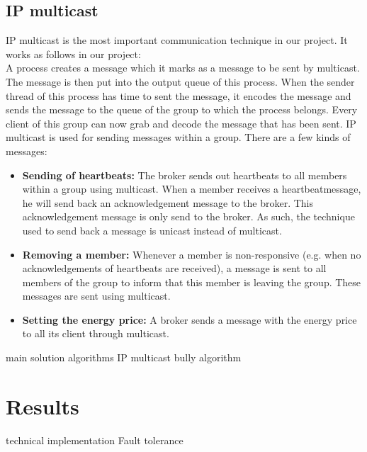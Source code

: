 \documentclass[10pt]{article} %
\begin{document}
\subsection{IP multicast}
IP multicast is the most important communication technique in our project. It works as follows in our project:\\
A process creates a message which it marks as a message to be sent by multicast. The message is then put into the output queue of this process. When the sender thread of this process has time to sent the message, it encodes the message and sends the message to the queue of the group to which the process belongs. Every client of this group can now grab and decode the message that has been sent.
IP multicast is used for sending messages within a group. There are a few kinds of messages: %
\begin{itemize}
 \item \textbf{Sending of heartbeats:} The broker sends out heartbeats to all members within a group using multicast. When a member receives a heartbeatmessage, he will send back an acknowledgement message to the broker. This acknowledgement message is only send to the broker. As such, the technique used  to send back a message is unicast instead of multicast.\\
 \item \textbf{Removing a member:} Whenever a member is non-responsive (e.g. when no acknowledgements of heartbeats are received), a message is sent to all members of the group to inform that this member is leaving the group. These messages are sent using multicast.\\
 \item \textbf{Setting the energy price:} A broker sends a message with the energy price to all its client through multicast.\\
\end{itemize}


main solution
algorithms
IP multicast
bully algorithm


\section{Results}

technical implementation
Fault tolerance

 
\end{document}
